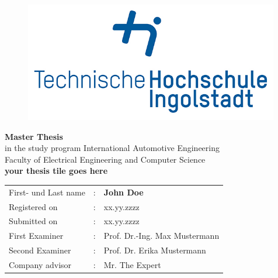 

\begin{titlepage}	
		\begin{figure}[!h]
			\centering
			\includegraphics[width={0.99\textwidth}]{images/thiRGB.jpg}	
		\end{figure}																			
	
	\begin{center}
		\hrulefill 
	\end{center}
	
	
	\begin{center}	
		\vspace{1cm}
		
		\huge\textbf{
			Master Thesis}\\[2.5em]
		\normalsize
			in the study program International Automotive Engineering\\ Faculty of Electrical Engineering and Computer Science	\\ [7em]
	
		\Large\textbf{your thesis tile goes here}	 \\ 

	\end{center}

	\vfill
	
	
	\begin{tabular}{lll}
		First- und Last name &: & \textbf{John Doe}	\\ [3em]
		
		Registered on &:	& xx.yy.zzzz	\\ [1em] %
		Submitted on &:	& xx.yy.zzzz	\\ [3em] %
		
		First Examiner &: 	& Prof. Dr.-Ing. Max Mustermann	\\ [1em]
		Second Examiner &: 	& Prof. Dr. Erika Mustermann	\\[3em]
		
		Company advisor &:	& Mr. The Expert \\ %
	\end{tabular}
	
\end{titlepage}

\restoregeometry